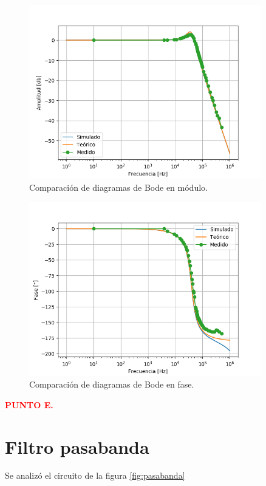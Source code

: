 \begin{figure}[H]
	\centering
	\includegraphics[width=0.9\textwidth]{Ejercicio2/Mediciones/Modulo.png}
\caption{Comparación de diagramas de Bode en módulo.}
	\label{fig:bodemod}
\end{figure}
\begin{figure}[H]
	\centering
	\includegraphics[width=0.9\textwidth]{Ejercicio2/Mediciones/Fase.png}
\caption{Comparación de diagramas de Bode en fase.}
	\label{fig:bodefase}
\end{figure}

\begin{center}
	\textcolor{red}{\textbf{PUNTO E.}}
\end{center}

\section{Filtro pasabanda}
Se analizó el circuito de la figura \ref{fig:pasabanda}

